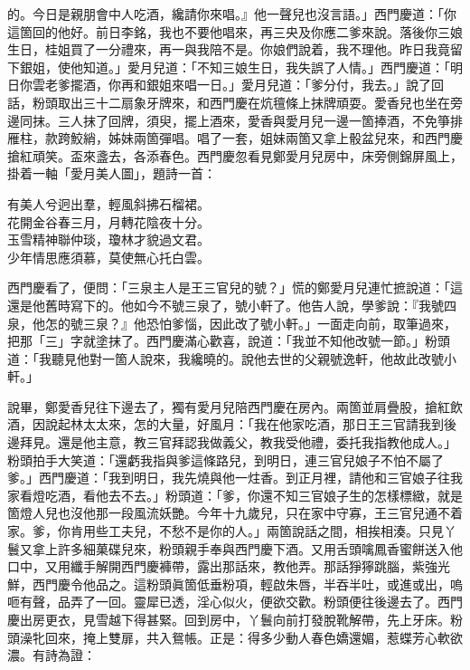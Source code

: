 的。今日是親朋會中人吃酒，纔請你來唱。』他一聲兒也沒言語。」西門慶道：「你這箇回的他好。前日李銘，我也不要他唱來，再三央及你應二爹來說。落後你三娘生日，桂姐買了一分禮來，再一與我陪不是。你娘們說着，我不理他。昨日我竟留下銀姐，使他知道。」愛月兒道：「不知三娘生日，我失誤了人情。」西門慶道：「明日你雲老爹擺酒，你再和銀姐來唱一日。」愛月兒道：「爹分付，我去。」說了回話，粉頭取出三十二扇象牙牌來，和西門慶在炕氊條上抹牌頑耍。愛香兒也坐在旁邊同抹。三人抹了回牌，須臾，擺上酒來，愛香與愛月兒一邊一箇捧酒，不免箏排雁柱，款跨鮫綃，姊妹兩箇彈唱。唱了一套，姐妹兩箇又拿上骰盆兒來，和西門慶搶紅頑笑。盃來盞去，各添春色。西門慶忽看見鄭愛月兒房中，床旁側錦屏風上，掛着一軸「愛月美人圖」，題詩一首：

\begin{myquote} 
有美人兮迥出羣，輕風斜拂石榴裙。\\花開金谷春三月，月轉花陰夜十分。\\玉雪精神聯仲琰，瓊林才貌過文君。\\少年情思應須慕，莫使無心托白雲。{}

\end{myquote} 

西門慶看了，便問：「三泉主人是王三官兒的號？」慌的鄭愛月兒連忙摭說道：「這還是他舊時寫下的。他如今不號三泉了，號小軒了。{}他告人說，學爹說：『我號四泉，他怎的號三泉？』他恐怕爹惱，因此改了號小軒。」一面走向前，取筆過來，把那「三」字就塗抹了。西門慶滿心歡喜，{}說道：「我並不知他改號一節。」粉頭道：「我聽見他對一箇人說來，我纔曉的。說他去世的父親號逸軒，他故此改號小軒。」

說畢，鄭愛香兒往下邊去了，獨有愛月兒陪西門慶在房內。兩箇並肩疊股，搶紅飲酒，因說起林太太來，怎的大量，好風月：「我在他家吃酒，那日王三官請我到後邊拜見。還是他主意，教三官拜認我做義父，教我受他禮，委托我指教他成人。」{}粉頭拍手大笑道：「還虧我指與爹這條路兒，到明日，連三官兒娘子不怕不屬了爹。」{}西門慶道：「我到明日，我先燒與他一炷香。到正月裡，請他和三官娘子往我家看燈吃酒，看他去不去。」粉頭道：「爹，你還不知三官娘子生的怎樣標緻，就是箇燈人兒也沒他那一段風流妖艷。今年十九歲兒，只在家中守寡，王三官兒通不着家。{}爹，你肯用些工夫兒，不愁不是你的人。」兩箇說話之間，相挨相湊。只見丫鬟又拿上許多細菓碟兒來，粉頭親手奉與西門慶下酒。又用舌頭噙鳳香蜜餅送入他口中，又用纖手解開西門慶褲帶，露出那話來，教他弄。那話猙獰跳腦，紫強光鮮，西門慶令他品之。這粉頭眞箇低垂粉項，輕啟朱唇，半吞半吐，或進或出，嗚咂有聲，品弄了一回。靈犀已透，淫心似火，便欲交歡。粉頭便往後邊去了。西門慶出房更衣，見雪越下得甚緊。回到房中，丫鬟向前打發脫靴解帶，先上牙床。粉頭澡牝回來，掩上雙扉，共入鴛帳。正是：得多少動人春色嬌還媚，惹蝶芳心軟欲濃。有詩為證：

